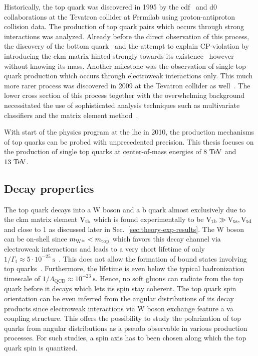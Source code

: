 Historically, the top quark was discovered in 1995 by the \gls{cdf}~\cite{Abe:1995hr} and \gls{d0}~\cite{Abachi:1994td} collaborations at the Tevatron collider at Fermilab using proton-antiproton collision data. The production of top quark pairs which occurs through strong interactions was analyzed. Already before the direct observation of this process, the discovery of the bottom quark~\cite{Augustin:1975yq,PhysRevLett.39.252} and the attempt to explain CP-violation by introducing the \gls{ckm} matrix hinted strongly towards its existence~\cite{Kobayashi01021973} however without knowing its mass. Another milestone was the observation of single top quark production which occurs through electroweak interactions only. This much more rarer process was discovered in 2009 at the Tevatron collider as well~\cite{PhysRevLett.103.092002,PhysRevLett.103.092001}. The lower cross section of this process together with the overwhelming background necessitated the use of sophisticated analysis techniques such as multivariate classifiers and the matrix element method~\cite{Mitrevski}.

With start of the physics program at the \gls{lhc} in 2010, the production mechanisms of top quarks can be probed with unprecedented precision. This thesis focuses on the production of single top quarks at center-of-mass energies of $8~\mathrm{TeV}$ and $13~\mathrm{TeV}$.

\subsection{Decay properties}

The top quark decays into a W boson and a b quark almost exclusively due to the \gls{ckm} matrix element ${\mathrm{V}_\mathrm{tb}}$ which is found experimentally to be ${\mathrm{V}_\mathrm{tb}}\gg{\mathrm{V}_\mathrm{ts}},{\mathrm{V}_\mathrm{td}}$ and close to 1 as discussed later in Sec.~\ref{sec:theory-exp-results}. The W boson can be on-shell since $m_{\mathrm{W}^{\pm}}<m_\mathrm{top}$ which favors this decay channel via electroweak interactions and leads to a very short lifetime of only $1/\Gamma_\mathrm{t}\approx 5\cdot10^{-25}~\mathrm{s}$~\cite{Olive:2016xmw}. This does not allow the formation of bound states involving top quarks~\cite{BIGI1986157}. Furthermore, the lifetime is even below the typical hadronization timescale of $1/\Lambda_\mathrm{QCD}\approx 10^{-23}~\mathrm{s}$. Hence, no soft gluons can radiate from the top quark before it decays which lets its spin stay coherent. The top quark spin orientation can be even inferred from the angular distributions of its decay products since electroweak interactions via $\mathrm{W}$ boson exchange feature a \gls{va} coupling structure. This offers the possibility to study the polarization of top quarks from angular distributions as a pseudo observable in various production processes. For such studies, a spin axis has to been chosen along which the top quark spin is quantized.

